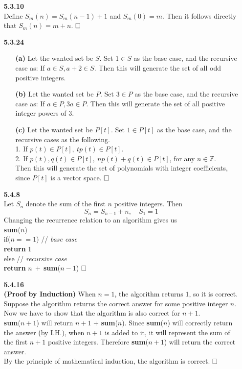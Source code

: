 \documentclass{article}
\newcommand*{\qed}{\hfill\ensuremath{\square\\}}%
\newcommand*{\tab}{\hspace*{5mm}}%
\begin{document}
\begin{itemize}
\item[\large \textbf{5.3.10}] ~\\
Define $S_m(n) = S_m(n-1) + 1$ and $S_m(0)=m$. Then it follows directly that $S_m(n) = m + n$. \qed

\item[\large \textbf{5.3.24}] ~
	\begin{enumerate}
		\item[\textbf{(a)}] Let the wanted set be $S$. Set $1\in S$ as the base case, and the recursive case as: If $a\in S, a+2 \in S$. Then this will generate the set of all odd positive integers.
		\item[\textbf{(b)}] Let the wanted set be $P$. Set $3\in P$ as the base case, and the recursive case as: If $a\in P, 3a \in P$. Then this will generate the set of all positive integer powers of $3$.
		\item[\textbf{(c)}] Let the wanted set be $P[t]$. Set $1\in P[t]$ as the base case, and the recursive cases as the following. \\
		1. If $p(t)\in P[t], \: tp(t)\in P[t]$. \\
		2. If $p(t), q(t)\in P[t], \: np(t) + q(t)\in P[t]$, for any $n\in \mathbb{Z}$. \\
		Then this will generate the set of polynomials with integer coefficients, since $P[t]$ is a vector space. \qed 
	\end{enumerate}

\item[\large \textbf{5.4.8}] ~\\
Let $S_n$ denote the sum of the first $n$ positive integers. Then $$S_n = S_{n-1} + n, \quad S_1 = 1$$
Changing the recurrence relation to an algorithm gives us \\
\textbf{sum}($n$)\\
\tab if($n == 1$) //\textit{ base case}\\
\tab\tab \textbf{return} $1$\\
\tab else // \textit{ recursive case}\\
\tab\tab \textbf{return} $n \:+ \:$\textbf{sum}($n-1$) \qed


\item[\large \textbf{5.4.16}] ~\\
\textbf{(Proof by Induction)} When $n=1$, the algorithm returns $1$, so it is correct. \\
Suppose the algorithm returns the correct answer for some positive integer $n$. Now we have to show that the algorithm is also correct for $n+1$. \\
\textbf{sum}($n+1$) will return $n+1$ + \textbf{sum}($n$). Since \textbf{sum}($n$) will correctly return the answer (by I.H.), when $n+1$ is added to it, it will represent the sum of the first $n+1$ positive integers. Therefore \textbf{sum}($n+1$) will return the correct answer. \\
By the principle of mathematical induction, the algorithm is correct. \qed














\end{itemize}
\end{document}
